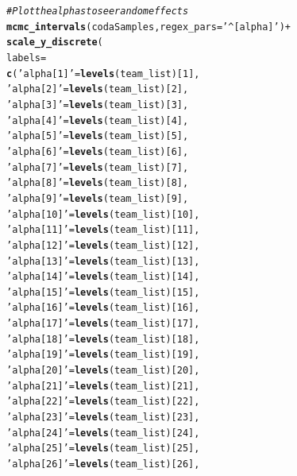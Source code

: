 \documentclass{article}\usepackage[]{graphicx}\usepackage[]{color}
\makeatletter
\newcommand{\hlnum}[1]{\textcolor[rgb]{0.686,0.059,0.569}{#1}}%
\newcommand{\hlstr}[1]{\textcolor[rgb]{0.192,0.494,0.8}{#1}}%
\newcommand{\hlcom}[1]{\textcolor[rgb]{0.678,0.584,0.686}{\textit{#1}}}%
\newcommand{\hlopt}[1]{\textcolor[rgb]{0,0,0}{#1}}%
\newcommand{\hlstd}[1]{\textcolor[rgb]{0.345,0.345,0.345}{#1}}%
\newcommand{\hlkwc}[1]{\textcolor[rgb]{0.333,0.667,0.333}{#1}}%
\newcommand{\hlkwd}[1]{\textcolor[rgb]{0.737,0.353,0.396}{\textbf{#1}}}%
\newenvironment{kframe}{%
 \def\at@end@of@kframe{}%
 \ifinner\ifhmode%
  \def\at@end@of@kframe{\end{minipage}}%
  \begin{minipage}{\columnwidth}%
 \fi\fi%
 \def\FrameCommand##1{\hskip\@totalleftmargin \hskip-\fboxsep
 \colorbox{shadecolor}{##1}\hskip-\fboxsep
     \hskip-\linewidth \hskip-\@totalleftmargin \hskip\columnwidth}%
 \MakeFramed {\advance\hsize-\width
   \@totalleftmargin\z@ \linewidth\hsize
   \@setminipage}}%
 {\par\unskip\endMakeFramed%
 \at@end@of@kframe}
\newenvironment{knitrout}{}{} %
\makeatother
\begin{document}
\begin{knitrout}
\begin{kframe}
\begin{alltt}
\hlcom{# Plot the alphas to see random effects}
\hlkwd{mcmc_intervals}\hlstd{(codaSamples,}\hlkwc{regex_pars} \hlstd{=} \hlstr{'^[alpha]'}\hlstd{)}\hlopt{+}
  \hlkwd{scale_y_discrete}\hlstd{(}
    \hlkwc{labels} \hlstd{=}
      \hlkwd{c}\hlstd{(}\hlstr{'alpha[1]'} \hlstd{=} \hlkwd{levels}\hlstd{(team_list)[}\hlnum{1}\hlstd{],}
        \hlstr{'alpha[2]'} \hlstd{=} \hlkwd{levels}\hlstd{(team_list)[}\hlnum{2}\hlstd{],}
        \hlstr{'alpha[3]'} \hlstd{=} \hlkwd{levels}\hlstd{(team_list)[}\hlnum{3}\hlstd{],}
        \hlstr{'alpha[4]'} \hlstd{=} \hlkwd{levels}\hlstd{(team_list)[}\hlnum{4}\hlstd{],}
        \hlstr{'alpha[5]'} \hlstd{=} \hlkwd{levels}\hlstd{(team_list)[}\hlnum{5}\hlstd{],}
        \hlstr{'alpha[6]'} \hlstd{=} \hlkwd{levels}\hlstd{(team_list)[}\hlnum{6}\hlstd{],}
        \hlstr{'alpha[7]'} \hlstd{=} \hlkwd{levels}\hlstd{(team_list)[}\hlnum{7}\hlstd{],}
        \hlstr{'alpha[8]'} \hlstd{=} \hlkwd{levels}\hlstd{(team_list)[}\hlnum{8}\hlstd{],}
        \hlstr{'alpha[9]'} \hlstd{=} \hlkwd{levels}\hlstd{(team_list)[}\hlnum{9}\hlstd{],}
        \hlstr{'alpha[10]'} \hlstd{=} \hlkwd{levels}\hlstd{(team_list)[}\hlnum{10}\hlstd{],}
        \hlstr{'alpha[11]'} \hlstd{=} \hlkwd{levels}\hlstd{(team_list)[}\hlnum{11}\hlstd{],}
        \hlstr{'alpha[12]'} \hlstd{=} \hlkwd{levels}\hlstd{(team_list)[}\hlnum{12}\hlstd{],}
        \hlstr{'alpha[13]'} \hlstd{=} \hlkwd{levels}\hlstd{(team_list)[}\hlnum{13}\hlstd{],}
        \hlstr{'alpha[14]'} \hlstd{=} \hlkwd{levels}\hlstd{(team_list)[}\hlnum{14}\hlstd{],}
        \hlstr{'alpha[15]'} \hlstd{=} \hlkwd{levels}\hlstd{(team_list)[}\hlnum{15}\hlstd{],}
        \hlstr{'alpha[16]'} \hlstd{=} \hlkwd{levels}\hlstd{(team_list)[}\hlnum{16}\hlstd{],}
        \hlstr{'alpha[17]'} \hlstd{=} \hlkwd{levels}\hlstd{(team_list)[}\hlnum{17}\hlstd{],}
        \hlstr{'alpha[18]'} \hlstd{=} \hlkwd{levels}\hlstd{(team_list)[}\hlnum{18}\hlstd{],}
        \hlstr{'alpha[19]'} \hlstd{=} \hlkwd{levels}\hlstd{(team_list)[}\hlnum{19}\hlstd{],}
        \hlstr{'alpha[20]'} \hlstd{=} \hlkwd{levels}\hlstd{(team_list)[}\hlnum{20}\hlstd{],}
        \hlstr{'alpha[21]'} \hlstd{=} \hlkwd{levels}\hlstd{(team_list)[}\hlnum{21}\hlstd{],}
        \hlstr{'alpha[22]'} \hlstd{=} \hlkwd{levels}\hlstd{(team_list)[}\hlnum{22}\hlstd{],}
        \hlstr{'alpha[23]'} \hlstd{=} \hlkwd{levels}\hlstd{(team_list)[}\hlnum{23}\hlstd{],}
        \hlstr{'alpha[24]'} \hlstd{=} \hlkwd{levels}\hlstd{(team_list)[}\hlnum{24}\hlstd{],}
        \hlstr{'alpha[25]'} \hlstd{=} \hlkwd{levels}\hlstd{(team_list)[}\hlnum{25}\hlstd{],}
        \hlstr{'alpha[26]'} \hlstd{=} \hlkwd{levels}\hlstd{(team_list)[}\hlnum{26}\hlstd{],}

\end{alltt}
\end{kframe}
\end{knitrout}
\end{document}
